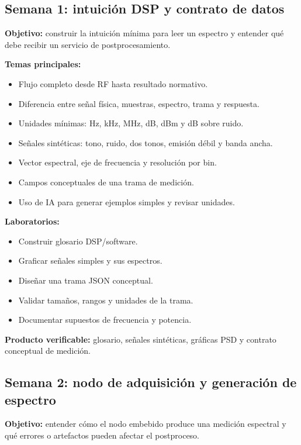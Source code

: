 \documentclass[11pt,a4paper]{article}
\newcommand{\producto}{\textbf{Producto verificable:} }
\begin{document}
\subsection*{Semana 1: intuición DSP y contrato de datos}

\textbf{Objetivo:} construir la intuición mínima para leer un espectro y entender qué debe recibir un servicio de postprocesamiento.

\textbf{Temas principales:}

\begin{itemize}
  \item Flujo completo desde RF hasta resultado normativo.
  \item Diferencia entre señal física, muestras, espectro, trama y respuesta.
  \item Unidades mínimas: Hz, kHz, MHz, dB, dBm y dB sobre ruido.
  \item Señales sintéticas: tono, ruido, dos tonos, emisión débil y banda ancha.
  \item Vector espectral, eje de frecuencia y resolución por bin.
  \item Campos conceptuales de una trama de medición.
  \item Uso de IA para generar ejemplos simples y revisar unidades.
\end{itemize}

\textbf{Laboratorios:}

\begin{itemize}
  \item Construir glosario DSP/software.
  \item Graficar señales simples y sus espectros.
  \item Diseñar una trama JSON conceptual.
  \item Validar tamaños, rangos y unidades de la trama.
  \item Documentar supuestos de frecuencia y potencia.
\end{itemize}

\producto glosario, señales sintéticas, gráficas PSD y contrato conceptual de medición.

\subsection*{Semana 2: nodo de adquisición y generación de espectro}

\textbf{Objetivo:} entender cómo el nodo embebido produce una medición espectral y qué errores o artefactos pueden afectar el postproceso.
\end{document}
